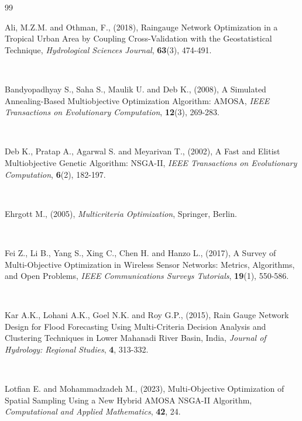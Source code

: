 \documentclass[10pt,twoside]{article}
\numberwithin{equation}{section}
\begin{document}
\begin{thebibliography}{99}

 


Ali, M.Z.M. and Othman, F., (2018), Raingauge Network Optimization in a Tropical Urban Area by Coupling Cross-Validation with the Geostatistical Technique, {\it Hydrological Sciences Journal}, \textbf{63}(3), 474-491.

 


Bandyopadhyay S., Saha S., Maulik U. and Deb K., (2008), A Simulated Annealing-Based Multiobjective Optimization Algorithm: AMOSA, {\it IEEE Transactions on Evolutionary Computation}, \textbf{12}(3), 269-283.

 


Deb K., Pratap A., Agarwal S. and Meyarivan T., (2002), A Fast and Elitist Multiobjective Genetic Algorithm: NSGA-II, {\it IEEE Transactions on Evolutionary Computation}, \textbf{6}(2), 182-197.

 


Ehrgott M., (2005), {\it Multicriteria Optimization}, Springer, Berlin.

 


Fei Z., Li B., Yang S., Xing C., Chen H. and Hanzo L., (2017), A Survey of Multi-Objective Optimization in Wireless Sensor Networks: Metrics, Algorithms, and Open Problems, {\it IEEE Communications Surveys Tutorials}, \textbf{19}(1), 550-586.

 


Kar A.K., Lohani A.K., Goel N.K. and Roy G.P., (2015), Rain Gauge Network Design for Flood Forecasting Using Multi-Criteria Decision Analysis and Clustering Techniques in Lower Mahanadi River Basin, India, {\it Journal of Hydrology: Regional Studies}, \textbf{4}, 313-332.

 


Lotfian E. and Mohammadzadeh M., (2023), Multi-Objective Optimization of Spatial Sampling Using a New Hybrid AMOSA NSGA-II Algorithm, {\it Computational and Applied Mathematics}, \textbf{42}, 24.


\end{thebibliography}
\end{document}

